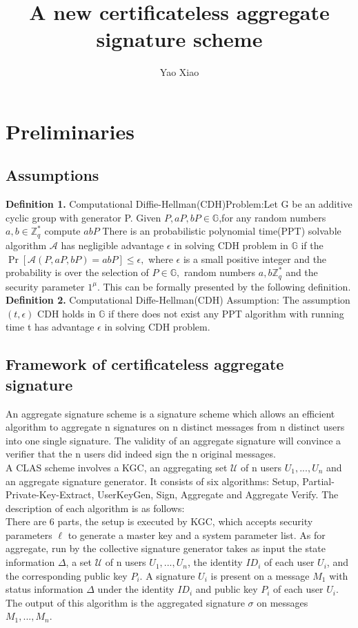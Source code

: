 \documentclass[11pt]{article}
\begin{document}
\author{Yao Xiao}
\title{A new certificateless aggregate signature scheme}
\maketitle

\medskip

\section{Preliminaries}
\subsection{Assumptions}
\textbf{Definition 1.} Computational Diffie-Hellman(CDH)Problem:Let G be an additive cyclic group with generator P. Given $P, aP, bP \in \mathbb{G}$,for any random numbers \(a, b \in \mathbb{Z}_{q}^{*}\) compute \(a b P\)
There is an probabilistic polynomial time(PPT) solvable algorithm \(\mathcal{A}\) has negligible advantage \(\epsilon\) in solving \(\mathrm{CDH}\) problem in \(\mathbb{G}\) if the \(\operatorname{Pr}[\mathcal{A}(P, a P, b P)=a b P] \leq \epsilon,\) where \(\epsilon\) is a small positive integer and the probability is over the selection of \(P \in \mathbb{G},\) random numbers \(a, b \mathbb{Z}_{q}^{*}\) and the security parameter \(1^{\mu} .\) This can be formally presented by the following definition.\\
\textbf{Definition 2.} Computational Diffe-Hellman(CDH) Assumption: The assumption \((t, \epsilon)\) CDH holds in \(\mathbb{G}\) if there does not exist any PPT algorithm with running time t has advantage
\(\epsilon\) in solving \(\mathrm{CDH}\) problem.
\subsection{Framework of certificateless aggregate signature}
An aggregate signature scheme is a signature scheme which allows an efficient algorithm to aggregate n signatures on n distinct messages from n distinct users into one single signature. The validity of an aggregate signature will convince a verifier that the n users did indeed sign the n original messages.\\
A CLAS scheme involves a KGC, an aggregating set \(\mathcal{U}\) of n users $U_1, . . . , U_n$ and an aggregate signature generator. It consists of six algorithms: Setup, Partial-Private-Key-Extract, UserKeyGen, Sign, Aggregate and Aggregate Verify. The description of each algorithm is as follows:\\
There are 6 parts, the setup is executed by KGC, which accepts security parameters $\ell$ to generate a master key and a system parameter list. As for aggregate, run by the collective signature generator takes as input the state information $\Delta$, a set \(\mathcal{U}\) of n users $U_1, ..., U_n$, the identity $ID_i$ of each user $U_i$, and the corresponding public key $P_i$. A signature $U_i$ is present on a message $M_1$ with status information $\Delta$ under the identity $ID_i$ and public key $P_i$ of each user $U_i$. The output of this algorithm is the aggregated signature $\sigma$ on messages $M_1, ..., M_n$.
\end{document}
